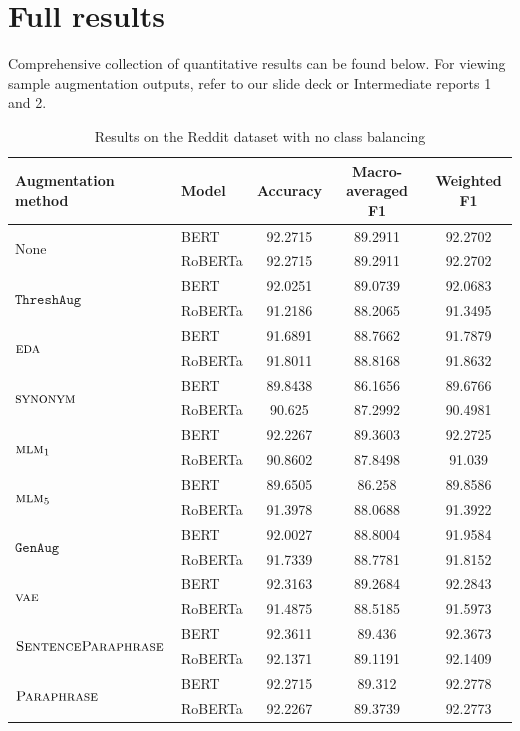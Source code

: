 \documentclass[11pt,a4paper]{article}
\newcommand{\noaug}{$\textrm{None}$}
\newcommand{\senttfpara}{$\textsc{SentenceParaphrase}$}
\newcommand{\tfpara}{$\textsc{Paraphrase}$}
\newcommand{\eda}{$\textsc{eda}$}
\newcommand{\synonym}{$\textsc{synonym}$}
\newcommand{\mlmone}{$\textsc{mlm}_1$}
\newcommand{\mlmfive}{$\textsc{mlm}_5$}
\newcommand{\genaug}{$\texttt{GenAug}$}
\newcommand{\threshaug}{$\texttt{ThreshAug}$}
\newcommand{\vae}{$\textsc{vae}$}
\begin{document}
\section{Full results} \label{sec:fullresults}
Comprehensive collection of quantitative results can be found below. For viewing sample augmentation outputs, refer to our slide deck or Intermediate reports 1 and 2.
\begin{table}[]
    \small
    \centering
    \begin{tabular}{llccc}
        \toprule
        \textbf{Augmentation method} & \textbf{Model} & \textbf{Accuracy} & \textbf{Macro-averaged F1} & \textbf{Weighted F1} \\
        \midrule
        \multirow{2}{*}{\noaug} & BERT & 92.2715 & 89.2911 & 92.2702 \\
        & RoBERTa & 92.2715 & 89.2911 & 92.2702 \\\midrule
        \multirow{2}{*}{\threshaug} & BERT & 92.0251 & 89.0739 & 92.0683 \\
        & RoBERTa & 91.2186 & 88.2065 & 91.3495 \\\cmidrule{2-5}
        \multirow{2}{*}{\eda} & BERT & 91.6891 & 88.7662 & 91.7879 \\
        & RoBERTa & 91.8011 & 88.8168 & 91.8632 \\\midrule
        \multirow{2}{*}{\synonym} & BERT & 89.8438 & 86.1656 & 89.6766 \\
        & RoBERTa & 90.625 & 87.2992 & 90.4981 \\\cmidrule{2-5}
        \multirow{2}{*}{\mlmone} & BERT & 92.2267 & 89.3603 & 92.2725 \\
        & RoBERTa & 90.8602 & 87.8498 & 91.039 \\\cmidrule{2-5}
        \multirow{2}{*}{\mlmfive} & BERT & 89.6505 & 86.258 & 89.8586 \\
        & RoBERTa & 91.3978 & 88.0688 & 91.3922 \\\midrule
        \multirow{2}{*}{\genaug} & BERT & 92.0027 & 88.8004 & 91.9584 \\
        & RoBERTa & 91.7339 & 88.7781 & 91.8152 \\\cmidrule{2-5}
        \multirow{2}{*}{\vae} & BERT & 92.3163 & 89.2684 & 92.2843 \\
        & RoBERTa & 91.4875 & 88.5185 & 91.5973 \\\midrule
        \multirow{2}{*}{\senttfpara} & BERT & 92.3611 & 89.436 & 92.3673 \\
        & RoBERTa & 92.1371 & 89.1191 & 92.1409 \\\cmidrule{2-5}
        \multirow{2}{*}{\tfpara} & BERT & 92.2715 & 89.312 & 92.2778 \\
        & RoBERTa & 92.2267 & 89.3739 & 92.2773 \\
        \bottomrule
    \end{tabular}
    \caption{Results on the Reddit dataset with no class balancing}
    \label{tab:reddit0}
\end{table}
\end{document}
